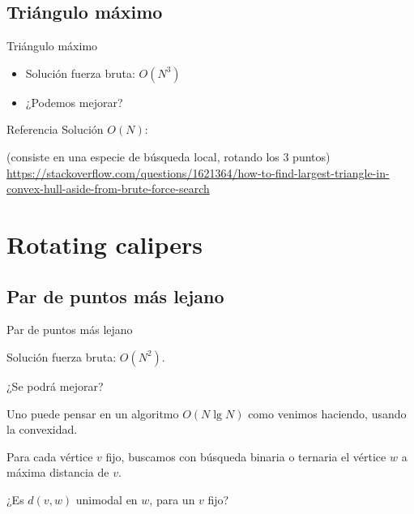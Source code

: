 \documentclass[compress]{beamer}
\begin{document}
\subsection{Triángulo máximo}

\begin{frame}{Triángulo máximo}
    \begin{itemize}
        \item Solución fuerza bruta: $O(N^3)$
        \item ¿Podemos mejorar?
        \pause
    \end{itemize}
\end{frame}


\begin{frame}{Referencia}
    Solución $O(N)$:
    
    (consiste en una especie de búsqueda local, rotando los 3 puntos)
    \vfill
    \tiny
    \url{https://stackoverflow.com/questions/1621364/how-to-find-largest-triangle-in-convex-hull-aside-from-brute-force-search}
\end{frame}


\section{Rotating calipers}

\subsection{Par de puntos más lejano}

\begin{frame}{Par de puntos más lejano}
    \begin{itemize}
        \item Solución fuerza bruta: $O(N^2)$.
        \item ¿Se podrá mejorar?
        \pause
         {
            \item Uno puede pensar en un algoritmo $O(N \lg N)$ como venimos haciendo, usando la convexidad.
            \item Para cada vértice $v$ fijo, buscamos con búsqueda binaria o ternaria el vértice $w$ a máxima distancia de $v$. 
            \item ¿Es $d(v,w)$ unimodal en $w$, para un $v$ fijo?
            \pause
        }
    \end{itemize}
\end{frame}
\end{document}
